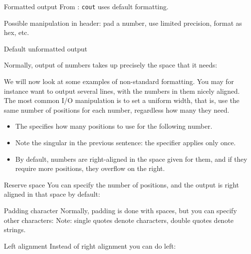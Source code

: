 \begin{block}{Formatted output}
  \label{sl:cformat}
  From :
  \lstinline{cout} uses default formatting.

  Possible manipulation in  header:
  pad a number, use limited precision, format as hex, etc.
\end{block}

\begin{slide}{Default unformatted output}
  \label{sl:unformat}
\end{slide}

Normally, output of numbers takes up precisely the space that it needs:

We will now look at some examples of non-standard formatting.
You may for instance want to output several lines, with the numbers
in them nicely aligned.
The most common I/O manipulation is to set a uniform width,
that is, use the same number of positions for each number,
regardless how many they need.
\begin{itemize}
\item The  specifies how many positions to use
  for the following number.
\item Note the singular in the previous sentence: the 
  specifier applies only once.
\item By default, numbers are right-aligned in the space
  given for them, and if they require more positions,
  they overflow on the right.
\end{itemize}

\begin{block}{Reserve space}
  \label{sl:io-setw}
  You can specify the number of positions, and the output is right
  aligned in that space by default:
\end{block}

\begin{block}{Padding character}
  \label{sl:io-fill}
  Normally, padding is done with spaces, but you can specify other characters:
Note: single quotes denote characters, double quotes denote strings.
\end{block}

\begin{block}{Left alignment}
  \label{sl:io-left}
  Instead of right alignment you can do left:
\end{block}

